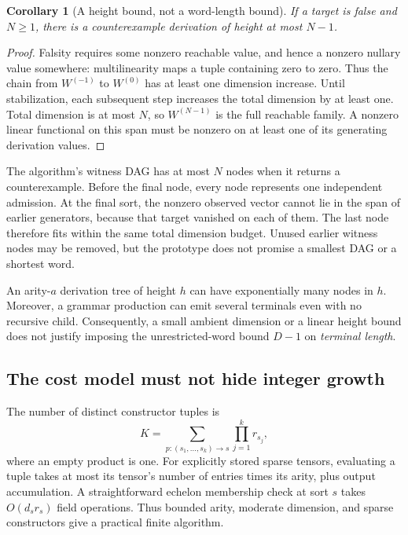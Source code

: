 \documentclass[11pt,letterpaper]{article}
\newtheorem{corollary}[theorem]{Corollary}
\theoremstyle{definition}\newtheorem{definition}[theorem]{Definition}
\theoremstyle{remark}\newtheorem{remark}[theorem]{Remark}
\begin{document}
\begin{corollary}[A height bound, not a word-length bound]\label{cor:height}
If a target is false and $N\ge1$, there is a counterexample derivation of height at most $N-1$.
\end{corollary}
\begin{proof}
Falsity requires some nonzero reachable value, and hence a nonzero nullary value somewhere: multilinearity maps a tuple containing zero to zero. Thus the chain from $W^{(-1)}$ to $W^{(0)}$ has at least one dimension increase. Until stabilization, each subsequent step increases the total dimension by at least one. Total dimension is at most $N$, so $W^{(N-1)}$ is the full reachable family. A nonzero linear functional on this span must be nonzero on at least one of its generating derivation values.
\end{proof}

The algorithm's witness DAG has at most $N$ nodes when it returns a counterexample. Before the final node, every node represents one independent admission. At the final sort, the nonzero observed vector cannot lie in the span of earlier generators, because that target vanished on each of them. The last node therefore fits within the same total dimension budget. Unused earlier witness nodes may be removed, but the prototype does not promise a smallest DAG or a shortest word.

An arity-$a$ derivation tree of height $h$ can have exponentially many nodes in $h$. Moreover, a grammar production can emit several terminals even with no recursive child. Consequently, a small ambient dimension or a linear height bound does not justify imposing the unrestricted-word bound $D-1$ on \emph{terminal length}.

\subsection{The cost model must not hide integer growth}
The number of distinct constructor tuples is
\begin{equation}\label{eq:tuple-cost}
 K=\sum_{p:(s_1,\ldots,s_k)\to s}\prod_{j=1}^k r_{s_j},
\end{equation}
where an empty product is one. For explicitly stored sparse tensors, evaluating a tuple takes at most its tensor's number of entries times its arity, plus output accumulation. A straightforward echelon membership check at sort $s$ takes $O(d_s r_s)$ field operations. Thus bounded arity, moderate dimension, and sparse constructors give a practical finite algorithm.
\end{document}
